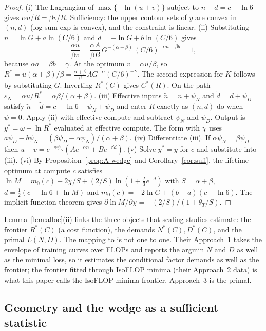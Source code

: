 \begin{proof}
(i) The Lagrangian of $\max\{-\ln(u+v)\}$ subject to $n+d=c-\ln6$ gives $\alpha u/R=\beta v/R$. Sufficiency: the
upper contour sets of $y$ are convex in $(n,d)$ (log-sum-exp is convex), and the constraint is linear.
(ii) Substituting $n=\ln G+a\ln(C/6)$ and $d=-\ln G+b\ln(C/6)$ gives
\[
\frac{\alpha u}{\beta v}=\frac{\alpha A}{\beta B}\,G^{-(\alpha+\beta)}\,(C/6)^{-\alpha a+\beta b}=1,
\]
because $\alpha a=\beta b=\gamma$. At the optimum $v=\alpha u/\beta$, so
$R^*=u(\alpha+\beta)/\beta=\frac{\alpha+\beta}{\beta}AG^{-\alpha}(C/6)^{-\gamma}$. The second expression for $K$ follows by
substituting $G$. Inverting $R^*(C)$ gives $C^*(R)$. On the path $\varepsilon_N=\alpha u/R^*=\alpha\beta/(\alpha+\beta)$.
(iii) Effective inputs $\tilde n=n+\psi_N$ and $\tilde d=d+\psi_D$ satisfy $\tilde n+\tilde d=c-\ln6+\psi_N+\psi_D$ and enter
$R$ exactly as $(n,d)$ do when $\psi=0$. Apply (ii) with effective compute and subtract $\psi_N$ and $\psi_D$. Output is
$y^*=\omega-\ln R^*$ evaluated at effective compute. The form with $\chi$ uses $a\psi_D-b\psi_N=(\beta\psi_D-\alpha\psi_N)/(\alpha+\beta)$.
(iv) Differentiate (iii). If $\alpha\psi_N=\beta\psi_D$ then $u+v=e^{-\alpha\psi_N}(Ae^{-\alpha n}+Be^{-\beta d})$.
(v) Solve $y^*=\bar y$ for $c$ and substitute into (iii).
(vi) By Proposition~\ref{prop:A-wedge} and Corollary~\ref{cor:suff}, the lifetime optimum at compute $c$ satisfies
$\ln M=m_0(c)-2\chi/S+(2/S)\ln(1+\tfrac{T}{3}e^{-d})$ with $S=\alpha+\beta$, $d=\tfrac12(c-\ln6+\ln M)$ and
$m_0(c)=-2\ln G+(b-a)(c-\ln6)$. The implicit function theorem gives
$\partial\ln M/\partial\chi=-(2/S)/(1+\theta_T/S)$.
\end{proof}

\begin{remark}
Lemma~\ref{lem:alloc}(ii) links the three objects that scaling studies estimate: the frontier $R^*(C)$ (a cost function),
the demands $N^*(C),D^*(C)$, and the primal $L(N,D)$. The mapping to \citet{hoffmann2022training} is not one to one.
Their Approach~1 takes the envelope of training curves over FLOPs and reports the argmin $N$ and $D$ as well as the
minimal loss, so it estimates the conditional factor demands as well as the frontier; the frontier fitted through
IsoFLOP minima (their Approach~2 data) is what this paper calls the IsoFLOP-minima frontier. Approach~3 is the primal.
\end{remark}

\subsection{Geometry and the wedge as a sufficient statistic}\label{app:geometry}

